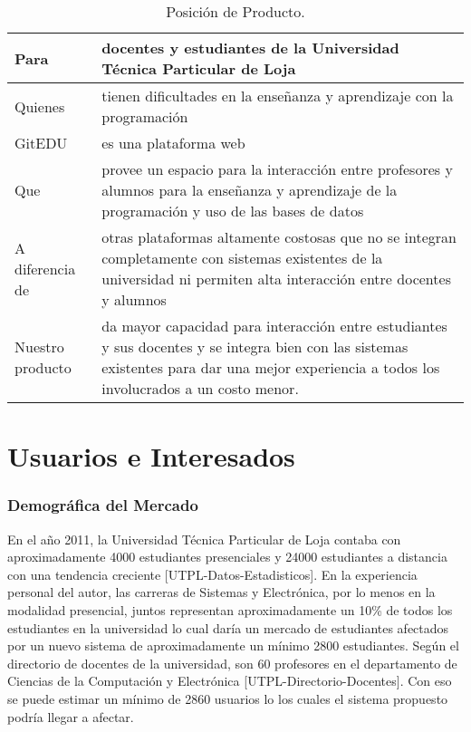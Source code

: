 \begin{table}[h!]
  \begin{tabular}{|p{}|p{}|}
    \hline
    Para & docentes y estudiantes de la Universidad Técnica Particular de Loja \\
    \hline
    Quienes & tienen dificultades en la enseñanza y aprendizaje con la programación \\
    \hline
    GitEDU & es una plataforma web \\
    \hline
    Que & provee un espacio para la interacción entre profesores y alumnos para la enseñanza y aprendizaje de la programación y uso de las bases de datos \\
    \hline
    A diferencia de & otras plataformas altamente costosas que no se integran completamente con sistemas existentes de la universidad ni permiten alta interacción entre docentes y alumnos \\
    \hline
    Nuestro producto & da mayor capacidad para interacción entre estudiantes y sus docentes y se integra bien con las sistemas existentes para dar una mejor experiencia a todos los involucrados a un costo menor. \\
    \hline
  \end{tabular}
  \caption{Posición de Producto.}
  \label{pos-prod}
\end{table}

\pagebreak

\section{Usuarios e Interesados}
\subsubsection{Demográfica del Mercado}
En el año 2011, la Universidad Técnica Particular de Loja contaba con aproximadamente 4000 estudiantes presenciales y 24000 estudiantes a distancia con una tendencia creciente [UTPL-Datos-Estadisticos]. En la experiencia personal del autor, las carreras de Sistemas y Electrónica, por lo menos en la modalidad presencial, juntos representan aproximadamente un 10\% de todos los estudiantes en la universidad lo cual daría un mercado de estudiantes afectados por un nuevo sistema de aproximadamente un mínimo 2800 estudiantes. Según el directorio de docentes de la universidad, son 60 profesores en el departamento de Ciencias de la Computación y Electrónica [UTPL-Directorio-Docentes]. Con eso se puede estimar un mínimo de 2860 usuarios lo los cuales el sistema propuesto podría llegar a afectar.

